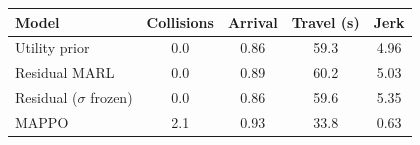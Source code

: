 \begin{tabular}{lcccc}
\toprule
Model & Collisions & Arrival & Travel (s) & Jerk \\
\midrule
Utility prior & 0.0 & 0.86 & 59.3 & 4.96 \\
Residual MARL & 0.0 & 0.89 & 60.2 & 5.03 \\
Residual ($\sigma$ frozen) & 0.0 & 0.86 & 59.6 & 5.35 \\
MAPPO & 2.1 & 0.93 & 33.8 & 0.63 \\
\bottomrule
\end{tabular}
